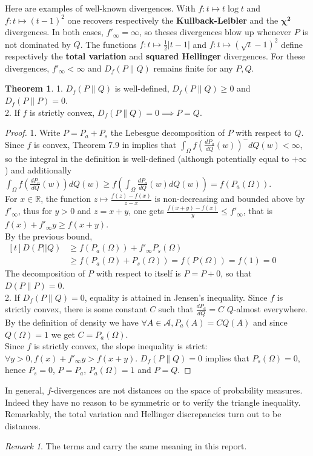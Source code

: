 \documentclass[12pt]{report}
\theoremstyle{definition}
\newtheorem{thm}[defi]{Theorem}
\theoremstyle{remark}
\newtheorem{rem}[defi]{Remark}
\begin{document}
Here are examples of well-known divergences. With $f:t\mapsto t\log t$ and $f:t\mapsto (t-1)^2$ one recovers respectively the \textbf{Kullback-Leibler} and the $\mathbf{\chi^2}$ divergences. In both cases, $f'_\infty=\infty$, so theses divergences blow up whenever $P$ is not dominated by $Q$. The functions $f:t\mapsto \frac 12 |t -1|$ and $f:t\mapsto (\sqrt t -1)^2$ define respectively the \textbf{total variation} and \textbf{squared Hellinger} divergences. For these divergences, $f'_\infty<\infty$ and $D_f(P\|Q)$ remains finite for any $P,Q$.

\begin{thm}
	1. $D_f(P\|Q)$ is well-defined, $D_f(P\|Q)\geq 0$ and $D_f(P\|P)=0$.\\
	2. If $f$ is strictly convex, $D_f(P\|Q)=0 \implies P=Q$.
\end{thm}

\begin{proof}
	1. Write $P=P_a + P_s$ the Lebesgue decomposition of $P$ with respect to $Q$. Since $f$ is convex, Theorem 7.9 in \cite{klenke2013probability} implies that $\int_\Omega f\left(\frac{dP_a}{dQ}(w) \right)^- dQ(w)<\infty$, so the integral in the definition is well-defined (although potentially equal to $+\infty$) and additionally $\int_\Omega f\left(\frac{dP_a}{dQ}(w) \right) dQ(w)\geq f\left(\int_\Omega \frac{dP_a}{dQ}(w) dQ(w) \right) = f(P_a(\Omega))$.\\
	For $x\in \mathbb R$, the function $z\mapsto \frac{f(z)-f(x)}{z-x}$ is non-decreasing and bounded above by $f'_\infty$, thus for $y>0$ and $z=x+y$, one gets $\frac{f(x+y)-f(x)}{y}\leq f'_\infty$, that is $f(x) + f'_\infty y \geq f(x+y)$.\\
	By the previous bound, $\begin{aligned}[t] D(P||Q)&\geq f(P_a(\Omega)) + f'_\infty P_s(\Omega)\\
	&\geq f(P_a(\Omega) + P_s(\Omega)) = f(P(\Omega))=f(1)=0\end{aligned}$ \\
	The decomposition of $P$ with respect to itself is $P=P+0$, so that $D(P\|P)=0$.\\
	2. If $D_f(P\|Q)=0$, equality is attained in Jensen's inequality. Since $f$ is strictly convex, there is some constant $C$ such that $\frac{dP_a}{dQ} = C$ $Q$-almost everywhere. By the definition of density we have $\forall A\in \mathcal A, P_a(A) = C Q(A)$ and since $Q(\Omega)=1$ we get $C=P_a(\Omega)$.\\
	Since $f$ is strictly convex, the slope inequality is strict: $\forall y> 0, f(x) + f'_\infty y > f(x+y)$. $D_f(P\|Q)=0$ implies that $P_s(\Omega)=0$, hence $P_s=0$, $P=P_a$, $P_a(\Omega)=1$ and $P=Q$. 
\end{proof}
\newpage 
In general, $f$-divergences are not distances on the space of probability measures. Indeed they have no reason to be symmetric or to verify the triangle inequality. Remarkably, the total variation and Hellinger discrepancies turn out to be distances.
\begin{rem}
 	The terms  and  carry the same meaning in this report.
\end{rem} 
\end{document}
